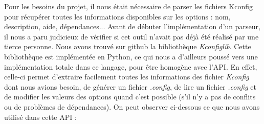 ﻿\documentclass[17pts]{report}
\begin{document}
Pour les besoins du projet, il nous était nécessaire de parser les fichiers
Kconfig pour récupérer toutes les informations disponibles sur les options :
nom, description, aide, dépendances... Avant de débuter l'implémentation d'un
parseur, il nous a paru judicieux de vérifier si cet outil n'avait pas déjà été
réalisé par une tierce personne.
Nous avons trouvé sur github \cite{Existant:lib:kconfiglib} la bibliothèque
\textit{Kconfiglib}. Cette bibliothèque est implémentée en Python, ce qui nous
a d'ailleurs poussé vers une implémentation totale dans ce langage, pour être
homogène avec l'API. En effet, celle-ci permet d'extraire facilement toutes les
informations des fichier \textit{Kconfig} dont nous avions besoin, de générer
un fichier \textit{.config}, de lire un fichier \textit{.config} et de modifier
les valeurs des options quand c'est possible (s'il n'y a pas de conflits ou de
problèmes de dépendances).
On peut observer ci-dessous ce que nous avons utilisé dans cette API :
\end{document}
